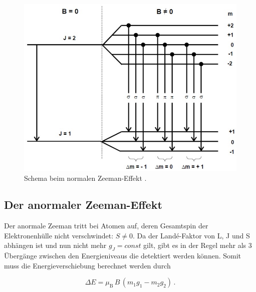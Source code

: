 \vspace{-5pt}
\begin{figure}[H]
    \centering
    \includegraphics[scale=0.3]{normalerzeeman.png}
    \caption{Schema beim normalen Zeeman-Effekt \cite{V27}.}
    \label{fig:norm}
\end{figure}

\subsection{Der anormaler Zeeman-Effekt}

Der anormale Zeeman tritt bei Atomen auf, deren Gesamtspin der Elektronenhülle nicht verschwindet: $S \neq 0$. Da der Landé-Faktor von L, J und S abhängen ist und nun nicht mehr 
$g_J = const$ gilt, gibt es in der Regel mehr als 3 Übergänge zwischen den Energieniveaus die detektiert werden können. Somit muss die Energieverschiebung berechnet werden durch 

\vspace{-15pt}
\begin{equation}
    \Delta E = \mu_\text{B}\,B\,(m_1 g_1 - m_2 g_2) \, .
    \label{eqn:anorm}
\end{equation}
